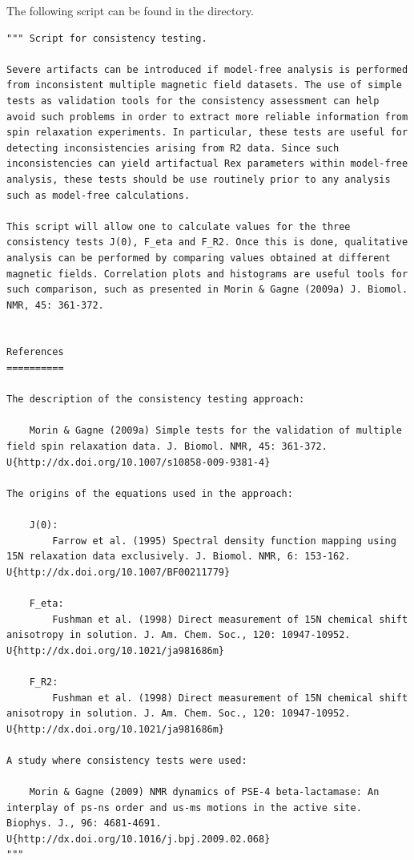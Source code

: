 The following script can be found in the  directory.

\begin{lstlisting}
""" Script for consistency testing.

Severe artifacts can be introduced if model-free analysis is performed from inconsistent multiple magnetic field datasets. The use of simple tests as validation tools for the consistency assessment can help avoid such problems in order to extract more reliable information from spin relaxation experiments. In particular, these tests are useful for detecting inconsistencies arising from R2 data. Since such inconsistencies can yield artifactual Rex parameters within model-free analysis, these tests should be use routinely prior to any analysis such as model-free calculations.

This script will allow one to calculate values for the three consistency tests J(0), F_eta and F_R2. Once this is done, qualitative analysis can be performed by comparing values obtained at different magnetic fields. Correlation plots and histograms are useful tools for such comparison, such as presented in Morin & Gagne (2009a) J. Biomol. NMR, 45: 361-372.


References
==========

The description of the consistency testing approach:

    Morin & Gagne (2009a) Simple tests for the validation of multiple field spin relaxation data. J. Biomol. NMR, 45: 361-372. U{http://dx.doi.org/10.1007/s10858-009-9381-4}

The origins of the equations used in the approach:

    J(0):
        Farrow et al. (1995) Spectral density function mapping using 15N relaxation data exclusively. J. Biomol. NMR, 6: 153-162. U{http://dx.doi.org/10.1007/BF00211779}

    F_eta:
        Fushman et al. (1998) Direct measurement of 15N chemical shift anisotropy in solution. J. Am. Chem. Soc., 120: 10947-10952. U{http://dx.doi.org/10.1021/ja981686m}

    F_R2:
        Fushman et al. (1998) Direct measurement of 15N chemical shift anisotropy in solution. J. Am. Chem. Soc., 120: 10947-10952. U{http://dx.doi.org/10.1021/ja981686m}

A study where consistency tests were used:

    Morin & Gagne (2009) NMR dynamics of PSE-4 beta-lactamase: An interplay of ps-ns order and us-ms motions in the active site. Biophys. J., 96: 4681-4691. U{http://dx.doi.org/10.1016/j.bpj.2009.02.068}
"""


\end{lstlisting}
